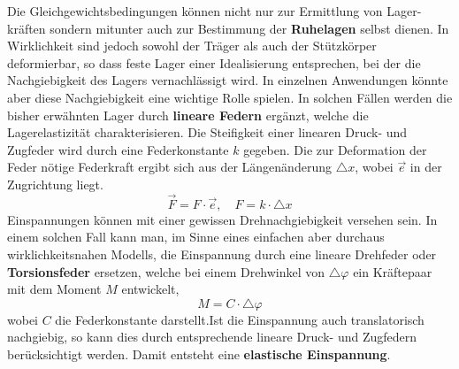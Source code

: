 \newline\newline
Die Gleichgewichtsbedingungen können nicht nur zur Ermittlung von Lager-kräften sondern mitunter auch zur Bestimmung der \textbf{Ruhelagen} selbst dienen.
\newline\newline
In Wirklichkeit sind jedoch sowohl der Träger als auch der Stützkörper deformierbar, so dass feste Lager einer Idealisierung entsprechen, bei der die Nachgiebigkeit des Lagers vernachlässigt wird. In einzelnen Anwendungen könnte aber diese Nachgiebigkeit eine wichtige Rolle spielen. In solchen Fällen werden die bisher erwähnten Lager durch \textbf{lineare Federn} ergänzt, welche die Lagerelastizität charakterisieren. Die Steifigkeit einer linearen Druck- und Zugfeder wird durch eine Federkonstante $k$ gegeben. Die zur Deformation der Feder nötige Federkraft ergibt sich aus der Längenänderung $\triangle x$, wobei $\overrightarrow{e}$ in der Zugrichtung liegt.
\begin{equation}
\boxed{\overrightarrow{F}=F\cdot \overrightarrow{e},\quad F=k\cdot \triangle x}
\end{equation}
Einspannungen können mit einer gewissen Drehnachgiebigkeit versehen sein. In einem solchen Fall kann man, im Sinne eines einfachen aber durchaus wirklichkeitsnahen Modells, die Einspannung durch eine lineare Drehfeder oder \textbf{Torsionsfeder} ersetzen, welche bei einem Drehwinkel von $\triangle \varphi$ ein Kräftepaar mit dem Moment $M$ entwickelt, 
\begin{equation}
\boxed{M=C\cdot \triangle \varphi}
\end{equation}
wobei $C$ die Federkonstante darstellt.Ist die Einspannung auch translatorisch nachgiebig, so kann dies durch entsprechende lineare Druck- und Zugfedern berücksichtigt werden. Damit entsteht eine \textbf{elastische Einspannung}.